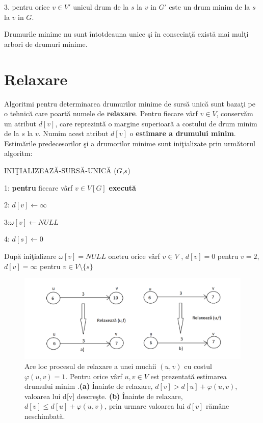 \documentclass[11pt,a4paper]{report}
\begin{document}
  	3. pentru orice $v\in V'$ unicul drum de la $s$ la $v$ in $G'$ este un drum minim de la $s$ la $v$ in $G$.
  	\vspace{0.3cm}
  	
  	Drumurile minime nu sunt \^ intotdeauna unice \c si \^ in consecin\c t\u a exist\u a mai mul\c ti arbori de drumuri minime.
  	
  	\section{Relaxare}
  	
  	Algoritmi pentru determinarea drumurilor minime de surs\u a unic\u a sunt baza\c ti pe o tehnic\u a care poart\u a numele de \textbf{relaxare}. Pentru fiecare v\^ arf $v\in V$, conserv\u am un atribut $d[v]$, care reprezint\u a o margine superioar\u a a costului de drum minim de la $s$ la $v$. Numim acest atribut $d[v]$ o \textbf{estimare a drumului minim}. Estim\u arile predecesorilor \c si a drumorilor minime sunt ini\c tializate prin urm\u atorul algoritm:
  	
  	\vspace{0.2cm}
  	INI\c TIALIZEAZ\u A-SURS\u A-UNIC\u A ($G$,$s$)
  	
  	\vspace{0.1cm}
  	1: \textbf{pentru} fiecare v\^ arf $v\in V[G]$ \textbf{execut\u a}
  	
  	2: \hspace{0.5cm}$d[v]\longleftarrow \infty$

    3:\hspace{0.6cm}$\omega[v]\longleftarrow NULL$
    
    4: $d[s]\longleftarrow 0$
    
    Dup\u a ini\c tializare $\omega [v]=NULL$ onetru orice v\^ arf $v\in V$ , $d[v] = 0$ pentru $v=2$, $d[v] = \infty $ pentru $v\in V\setminus \{s\}$
    \begin{figure}[!hbt]
    \centering
    	\includegraphics[width=13.2cm]{Figura6.png}
    	\caption{Are loc procesul de relaxare a unei muchii $(u,v)$ cu costul $\varphi(u,v)=1$. Pentru orice v\^ arf $u,v\in V$ est prezentat\u a estimarea drumului minim .\textbf{(a)} \^ Inainte de relaxare, $d[v] > d[u]+\varphi(u,v)$, valoarea lui d[v] descre\c ste. \textbf{(b)} \^ Inainte de relaxare, $d[v]\leq d[u]+\varphi(u,v)$, prin urmare valoarea lui $d[v]$ r\u am\^ ane neschimbat\u a. }
    \end{figure}
\end{document}
